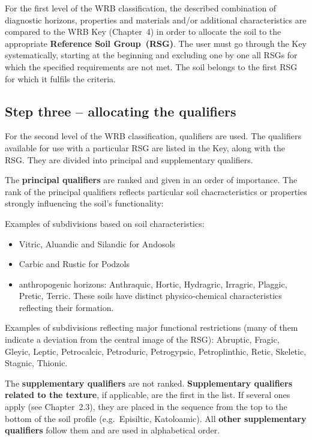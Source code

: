 \documentclass[
  letterpaper,
  DIV=11,
  numbers=noendperiod]{scrreprt}
\providecommand{\tightlist}{%
  \setlength{\itemsep}{0pt}\setlength{\parskip}{0pt}}\usepackage{longtable,booktabs,array}
\begin{document}
For the first level of the WRB classification, the described combination
of diagnostic horizons, properties and materials and/or additional
characteristics are compared to the WRB Key (Chapter~4) in order to
allocate the soil to the appropriate \textbf{Reference Soil
Group~(RSG)}. The user must go through the Key systematically, starting
at the beginning and excluding one by one all RSGs for which the
specified requirements are not met. The soil belongs to the first RSG
for which it fulfils the criteria.

\hypertarget{step-three-allocating-the-qualifiers}{%
\subsection{Step three -- allocating the
qualifiers}\label{step-three-allocating-the-qualifiers}}

For the second level of the WRB classification, qualifiers are used. The
qualifiers available for use with a particular RSG are listed in the
Key, along with the RSG. They are divided into principal and
supplementary qualifiers.

The \textbf{principal qualifiers} are ranked and given in an order of
importance. The rank of the principal qualifiers reflects particular
soil chacracteristics or properties strongly influencing the soil's
functionality:

Examples of subdivisions based on soil characteristics:

\begin{itemize}
\tightlist
\item
  Vitric, Aluandic and Silandic for Andosols
\item
  Carbic and Rustic for Podzols
\item
  anthropogenic horizons: Anthraquic, Hortic, Hydragric, Irragric,
  Plaggic, Pretic, Terric. These soils have distinct physico-chemical
  characteristics reflecting their formation.
\end{itemize}

Examples of subdivisions reflecting major functional restrictions (many
of them indicate a deviation from the central image of the RSG):
Abruptic, Fragic, Gleyic, Leptic, Petrocalcic, Petroduric, Petrogypsic,
Petroplinthic, Retic, Skeletic, Stagnic, Thionic.

The \textbf{supplementary qualifiers} are not ranked.
\textbf{Supplementary qualifiers related to the texture}, if applicable,
are the first in the list. If several ones apply (see Chapter~2.3), they
are placed in the sequence from the top to the bottom of the soil
profile (e.g.~Episiltic, Katoloamic). All \textbf{other supplementary
qualifiers} follow them and are used in alphabetical order.
\end{document}
